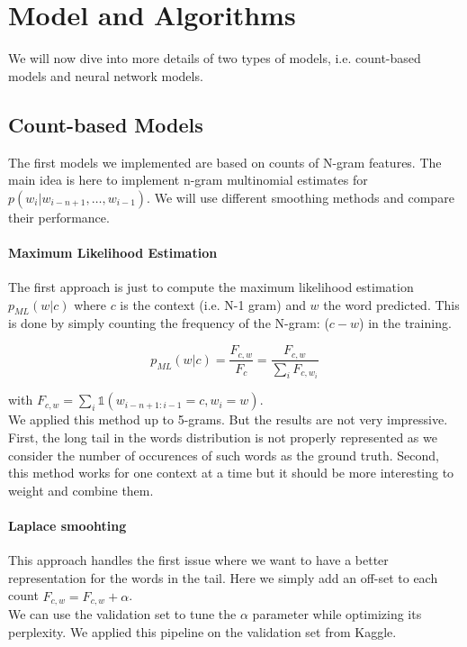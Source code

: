 \documentclass[11pt]{article}
\begin{document}
\section{Model and Algorithms}

We will now dive into more details of two types of models, i.e. count-based models and neural network models.

\subsection{Count-based Models}

The first models we implemented are based on counts of N-gram features. The main idea is here to implement n-gram multinomial estimates for $p(w_i|w_{i-n+1}, \hdots, w_{i-1})$. We will use different smoothing methods and compare their performance.

\paragraph{Maximum Likelihood Estimation}

The first approach is just to compute the maximum likelihood estimation $p_{ML}(w|c)$ where $c$ is the context (i.e. N-1 gram) and $w$ the word predicted. This is done by simply counting the frequency of the N-gram: ($c-w$) in the training.

\[
	p_{ML}(w|c) = \frac{F_{c,w}}{F_c} = \frac{F_{c,w}}{\sum_i F_{c,w_i}}
\]

with $ F_{c,w} = \sum_i \mathbb{1}(w_{i-n+1:i-1}=c, w_i=w)$.\\


We applied this method up to 5-grams. But the results are not very impressive. First, the long tail in the words distribution is not properly represented as we consider the number of occurences of such words as the ground truth. Second, this method works for one context at a time but it should be more interesting to weight and combine them.

\paragraph{Laplace smoohting}

This approach handles the first issue where we want to have a better representation for the words in the tail. Here we simply add an off-set to each count $\hat{F}_{c,w} = F_{c,w} + \alpha $.\\

\noindent We can use the validation set to tune the $\alpha$ parameter while optimizing its perplexity. We applied this pipeline on the validation set from Kaggle.
\end{document}
